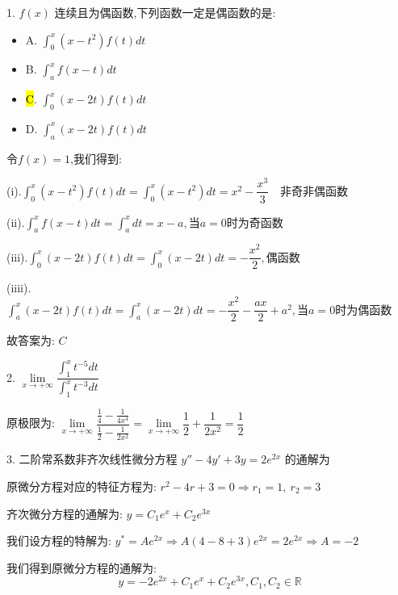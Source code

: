 1. $f(x)$ 连续且为偶函数,下列函数一定是偶函数的是: 
\begin{itemize}
	\item A. $\int_{0}^{x}(x-t^2)f(t)dt$ 
	\item B. $\int_{a}^{x}f(x-t)dt$ 
	\item \hl{C}. $\int_{0}^{x}(x-2t)f(t)dt$ 
	\item D. $\int_{a}^{x}(x-2t)f(t)dt$ 
\end{itemize}
\begin{solution}
	
	令$f(x)=1$,我们得到: 
	
	(i).$\int_{0}^{x}(x-t^2)f(t)dt=\int_{0}^{x}(x-t^2)dt=x^2-\dfrac{x^3}{3}\quad \text{非奇非偶函数}$
	
	(ii).$\int_{a}^{x}f(x-t)dt=\int_{a}^{x}dt=x-a,\text{当}a=0\text{时为奇函数}$
	
	(iii).$\int_{0}^{x}(x-2t)f(t)dt=\int_{0}^{x}(x-2t)dt=-\dfrac{x^2}{2},\text{偶函数}$
	
	(iiii). $\int_{a}^{x}(x-2t)f(t)dt=\int_{a}^{x}(x-2t)dt=-\dfrac{x^2}{2}-\dfrac{ax}{2}+a^2,\text{当}a=0\text{时为偶函数}$
	
	故答案为: $C$
\end{solution}


2. $\lim\limits_{x\rightarrow +\infty}\dfrac{\int_{1}^{x}t^{-5}dt}{\int_{1}^{x}t^{-3}dt}$
\begin{solution}
	
	原极限为: $\lim\limits_{x\rightarrow +\infty}\dfrac{\frac{1}{4}-\frac{1}{4x^4}}{\frac{1}{2}-\frac{1}{2x^2}}=\lim\limits_{x\rightarrow +\infty}\dfrac{1}{2}+\dfrac{1}{2x^2}=\dfrac{1}{2}$
\end{solution}
3. 二阶常系数非齐次线性微分方程 $y''-4y'+3y=2e^{2x}$ 的通解为
\begin{solution}
	
	原微分方程对应的特征方程为: $r^2-4r+3=0\Rightarrow r_{1}=1,\ r_{2}=3$
	
	齐次微分方程的通解为: $y=C_{1}e^{x}+C_{2}e^{3x}$
	
	我们设方程的特解为: $y^{*}=Ae^{2x}\Rightarrow A(4-8+3)e^{2x}=2e^{2x}\Rightarrow A=-2$
	
	我们得到原微分方程的通解为: 
	$$y=-2e^{2x}+C_{1}e^{x}+C_{2}e^{3x},C_{1},C_{2}\in\mathbb{R}$$
\end{solution}


